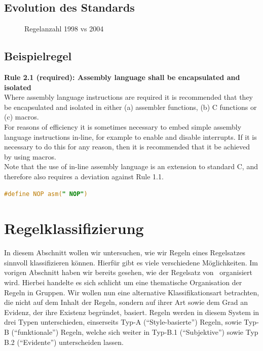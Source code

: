 \documentclass[a4paper,UKenglish,cleveref, autoref]{templates/lipics-v2019}
\begin{document}
    \subsection{Evolution des Standards}
    \label{subsec:evolution-des-standards}

    \begin{figure}[H]
        \centering
        \captionsetup{justification=centering,margin=2cm}
        
        \caption{Regelanzahl 1998 vs 2004}
    \end{figure}

    \subsection{Beispielregel}
    \label{subsec:beispielregel}

    \begin{minipage}{\linewidth}
        \begin{example}
        \textbf{Rule 2.1 (required): Assembly language shall be encapsulated and isolated\cite{MISRA2004}}\\
        Where assembly language instructions are required it is recommended that they be encapsulated
        and isolated in either (a) assembler functions, (b) C functions or (c) macros.\\
        For reasons of efficiency it is sometimes necessary to embed simple assembly language instructions
        in-line, for example to enable and disable interrupts.
        If it is necessary to do this for any reason, then it is recommended that it be achieved by using macros.\\
        Note that the use of in-line assembly language is an extension to standard C, and therefore also
        requires a deviation against Rule 1.1.
        \begin{lstlisting}[language=C]
            #define NOP asm(" NOP")
        \end{lstlisting}
        \end{example}
    \end{minipage}

    \section{Regelklassifizierung}
    \label{sec:regelklassifizierung}
    In diesem Abschnitt wollen wir untersuchen, wie wir Regeln eines Regelsatzes sinnvoll klassifizieren können.
    Hierfür gibt es viele verschiedene Möglichkeiten.
    Im vorigen Abschnitt haben wir bereits gesehen, wie der Regelsatz von \misra\ organisiert wird.
    Hierbei handelte es sich schlicht um eine thematische Organisation der Regeln in Gruppen.
    Wir wollen nun eine alternative Klassifikationsart betrachten, die nicht auf dem Inhalt der Regeln, sondern auf ihrer
    Art sowie dem Grad an Evidenz, der ihre Existenz begründet, basiert.
    Regeln werden in diesem System in drei Typen unterschieden, einserseits Typ-A (\enquote{Style-basierte}) Regeln,
    sowie Typ-B (\enquote{funktionale}) Regeln, welche sich weiter in Typ-B.1 (\enquote{Subjektive}) sowie
    Typ B.2 (\enquote{Evidente}) unterscheiden lassen.\cite{hatton2004safer}
\end{document}
